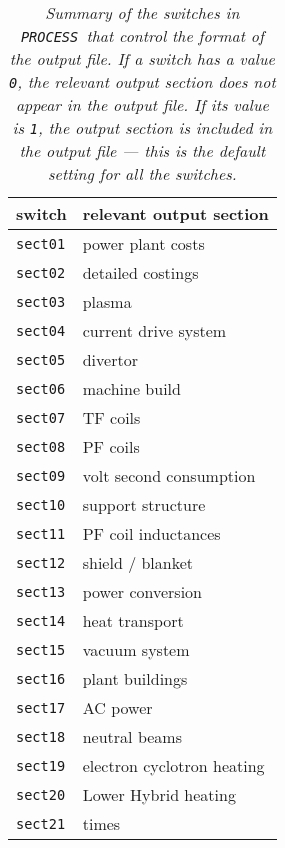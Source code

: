 \documentclass[11pt,a4paper]{report}
\newcommand{\process}{\mbox{\texttt{PROCESS}}}
\begin{document}
\begin{table}[tbph]
\begin{center}

\begin{tabular}{||l|l||} \hline
switch      & relevant output section    \\ \hline
\texttt{sect01} & power plant costs          \\
\texttt{sect02} & detailed costings          \\
\texttt{sect03} & plasma                     \\
\texttt{sect04} & current drive system       \\
\texttt{sect05} & divertor                   \\
\texttt{sect06} & machine build              \\
\texttt{sect07} & TF coils                   \\
\texttt{sect08} & PF coils                   \\
\texttt{sect09} & volt second consumption    \\
\texttt{sect10} & support structure          \\
\texttt{sect11} & PF coil inductances        \\
\texttt{sect12} & shield / blanket           \\
\texttt{sect13} & power conversion           \\
\texttt{sect14} & heat transport             \\
\texttt{sect15} & vacuum system              \\
\texttt{sect16} & plant buildings            \\
\texttt{sect17} & AC power                   \\
\texttt{sect18} & neutral beams              \\
\texttt{sect19} & electron cyclotron heating \\
\texttt{sect20} & Lower Hybrid heating       \\ 
\texttt{sect21} & times                      \\ \hline
\end{tabular}
\end{center}
\caption[List of switches controlling the output to file]
{\label{tab:osections}
  \textit{Summary of the switches in \process\ that control the format of the output
    file. If a switch has a value \texttt{0}, the relevant output section
    does not appear in the output file. If its value is \texttt{1}, the
    output section is included in the output file --- this is the default
    setting for all the switches.}
}
\end{table}
\end{document}
